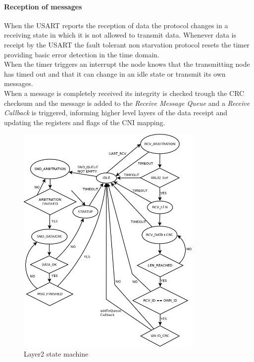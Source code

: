 \paragraph{Reception of messages}
When the USART reports the reception of data the protocol changes in a receiving state in which it is not allowed to transmit data.
Whenever data is receipt by the USART the fault tolerant non starvation protocol resets the timer providing basic error detection in the time domain.\\

When the timer triggers an interrupt the node knows that the transmitting node has timed out and that it can change in an idle state or transmit its own messages.\\

When a message is completely received its integrity is checked trough the CRC checksum and the message is added to the \textit{Receive Message Queue} and a \textit{Receive Callback} is triggered, informing higher level layers of the data receipt and updating the registers and flags of the CNI mapping.

%

\begin{figure}[H]
\centering
\includegraphics[width=0.8\textwidth]{../images/layer2_state_machine.png}
\caption{Layer2 state machine}
\label{fig:bus:design:layer2:statemachine}
\end{figure}